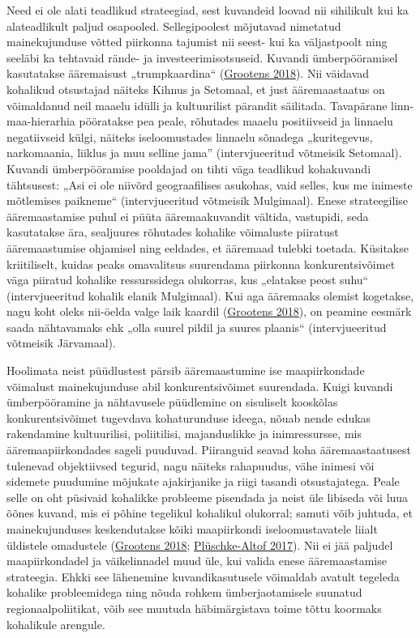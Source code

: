 \documentclass[estonian,]{article}
\begin{document}
Need ei ole alati teadlikud strateegiad, sest kuvandeid loovad nii sihilikult kui ka alateadlikult paljud osapooled. Sellegipoolest mõjutavad nimetatud mainekujunduse võtted piirkonna tajumist nii seest- kui ka väljastpoolt ning seeläbi ka tehtavaid rände- ja investeerimisotsuseid.
Kuvandi ümberpööramisel kasutatakse ääremaisust „trumpkaardina`` (\protect\hyperlink{Grootens2018}{Grootens 2018}). Nii väidavad kohalikud otsustajad näiteks Kihnus ja Setomaal, et just ääremaastaatus on võimaldanud neil maaelu idülli ja kultuurilist pärandit säilitada. Tavapärane linn-maa-hierarhia pööratakse pea peale, rõhutades maaelu positiivseid ja linnaelu negatiivseid külgi, näiteks iseloomustades linnaelu sõnadega „kuritegevus, narkomaania, liiklus ja muu selline jama'' (intervjueeritud võtmeisik Setomaal). Kuvandi ümberpööramise pooldajad on tihti väga teadlikud kohakuvandi tähtsusest: „Asi ei ole niivõrd geograafilises asukohas, vaid selles, kus me inimeste mõtlemises paikneme`` (intervjueeritud võtmeisik Mulgimaal). Enese strateegilise ääremaastamise puhul ei püüta ääremaakuvandit vältida, vastupidi, seda kasutatakse ära, sealjuures rõhutades kohalike võimaluste piiratust ääremaastumise ohjamisel ning eeldades, et ääremaad tulebki toetada. Küsitakse kriitiliselt, kuidas peaks omavalitsus suurendama piirkonna konkurentsivõimet väga piiratud kohalike ressurssidega olukorras, kus „elatakse peost suhu`` (intervjueeritud kohalik elanik Mulgimaal). Kui aga ääremaaks olemist kogetakse, nagu koht oleks nii-öelda valge laik kaardil (\protect\hyperlink{Grootens2018}{Grootens 2018}), on peamine eesmärk saada nähtavamaks ehk „olla suurel pildil ja suures plaanis`` (intervjueeritud võtmeisik Järvamaal).

Hoolimata neist püüdlustest pärsib ääremaastumine ise maapiirkondade võimalust mainekujunduse abil konkurentsivõimet suurendada. Kuigi kuvandi ümberpööramine ja nähtavusele püüdlemine on sisuliselt kooskõlas konkurentsivõimet tugevdava kohaturunduse ideega, nõuab nende edukas rakendamine kultuurilisi, poliitilisi, majanduslikke ja inimressursse, mis ääremaapiirkondades sageli puuduvad. Piiranguid seavad koha ääremaastaatusest tulenevad objektiivsed tegurid, nagu näiteks rahapuudus, vähe inimesi või sidemete puudumine mõjukate ajakirjanike ja riigi tasandi otsustajatega. Peale selle on oht püsivaid kohalikke probleeme pisendada ja neist üle libiseda või luua õõnes kuvand, mis ei põhine tegelikul kohalikul olukorral; samuti võib juhtuda, et mainekujunduses keskendutakse kõiki maapiirkondi iseloomustavatele liialt üldistele omadustele (\protect\hyperlink{Grootens2018}{Grootens 2018}; \protect\hyperlink{Pluxfcschke-Altof2017}{Plüschke-Altof 2017}). Nii ei jää paljudel maapiirkondadel ja väikelinnadel muud üle, kui valida enese ääremaastamise strateegia. Ehkki see lähenemine kuvandikasutusele võimaldab avatult tegeleda kohalike probleemidega ning nõuda rohkem ümberjaotamisele suunatud regionaalpoliitikat, võib see muutuda häbimärgistava toime tõttu koormaks kohalikule arengule.
\end{document}
